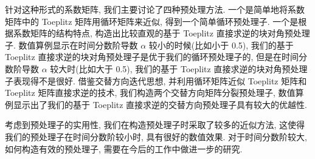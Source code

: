\documentclass{ecnumaster}
\begin{document}
针对这种形式的系数矩阵,
我们主要讨论了四种预处理方法.
一个是简单地将系数矩阵中的 Toeplitz 矩阵用循环矩阵来近似,
得到一个简单循环预处理子.
一个是根据系数矩阵的结构特点,
构造出比较直观的基于 Toeplitz 直接求逆的块对角预处理子.
数值算例显示在时间分数阶导数 $\alpha$ 较小的时候(比如小于 0.5),
我们的基于 Toeplitz 直接求逆的块对角预处理子是优于我们的循环预处理子的,
但是在时间分数阶导数 $\alpha$ 较大时(比如大于 0.5),
我们的基于 Toeplitz 直接求逆的块对角预处理子表现得不是很好.
借鉴交替方向迭代思想, 并利用循环矩阵近似 Toeplitz 矩阵和 Toeplitz 矩阵直接求逆的技术,
我们构造两个交替方向矩阵分裂预处理子,
数值算例显示出了我们的基于 Toeplitz 直接求逆的交替方向预处理子具有较大的优越性.

考虑到预处理子的实用性,
我们在构造预处理子时采取了较多的近似方法,
这使得我们的预处理子在时间分数阶较小时,
具有很好的数值效果.
对于时间分数阶较大,
如何构造有效的预处理子,
需要在今后的工作中做进一步的研究.
\end{document}
